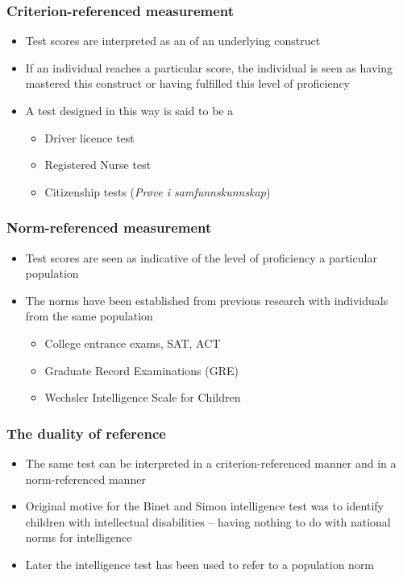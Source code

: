 \documentclass[compress]{beamer}\usepackage[]{graphicx}\usepackage[]{xcolor}
\begin{document}
\begin{frame}[fragile]
  \frametitle{Criterion-referenced measurement}
    \begin{itemize}
      \item Test scores are interpreted as an  of an underlying construct
      \item If an individual reaches a particular score, the individual is seen as having mastered this construct or having fulfilled this level of proficiency
      \item A test designed in this way is said to be a 
      \begin{itemize}
        \item Driver licence test
        \item Registered Nurse test
        \item Citizenship tests (\textit{Pr{\o}ve i samfunnskunnskap})
      \end{itemize}
    \end{itemize}
\end{frame}


\begin{frame}[fragile]
  \frametitle{Norm-referenced measurement}
    \begin{itemize}
      \item Test scores are seen as indicative of the level of proficiency  a particular population
      \item The norms have been established from previous research with individuals from the same population
      \begin{itemize}
        \item College entrance exams, SAT, ACT
        \item Graduate Record Examinations (GRE)
        \item Wechsler Intelligence Scale for Children
        \end{itemize}
    \end{itemize}
\end{frame}


\begin{frame}[fragile]
  \frametitle{The duality of reference}
    \begin{itemize}
      \item The same test can be interpreted in a criterion-referenced manner and in a norm-referenced manner
      \item  Original motive for the Binet and Simon intelligence test was to identify children with intellectual disabilities -- having nothing to do with national norms for intelligence
      \item Later the intelligence test has been used to refer to a population norm
    \end{itemize}
\end{frame}
\end{document}
